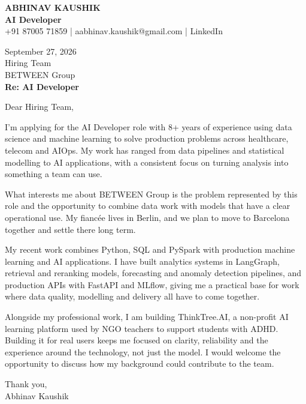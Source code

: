 \documentclass[10pt,a4paper]{article}
\begin{document}
\begin{center}
{\Large\bfseries ABHINAV KAUSHIK}\\[2pt]
{\bfseries AI Developer}\\[2pt]
+91 87005 71859 \quad | \quad aabhinav.kaushik@gmail.com \quad | \quad LinkedIn
\end{center}
\vspace{8pt}
September 27, 2026\\[6pt]
Hiring Team\\
BETWEEN Group\\[4pt]
\textbf{Re: AI Developer}

Dear Hiring Team,

I’m applying for the AI Developer role with 8+ years of experience using data science and machine learning to solve production problems across healthcare, telecom and AIOps. My work has ranged from data pipelines and statistical modelling to AI applications, with a consistent focus on turning analysis into something a team can use.

What interests me about BETWEEN Group is the problem represented by this role and the opportunity to combine data work with models that have a clear operational use. My fiancée lives in Berlin, and we plan to move to Barcelona together and settle there long term.

My recent work combines Python, SQL and PySpark with production machine learning and AI applications. I have built analytics systems in LangGraph, retrieval and reranking models, forecasting and anomaly detection pipelines, and production APIs with FastAPI and MLflow, giving me a practical base for work where data quality, modelling and delivery all have to come together.

Alongside my professional work, I am building ThinkTree.AI, a non-profit AI learning platform used by NGO teachers to support students with ADHD. Building it for real users keeps me focused on clarity, reliability and the experience around the technology, not just the model. I would welcome the opportunity to discuss how my background could contribute to the team.

Thank you,\\
Abhinav Kaushik
\end{document}
